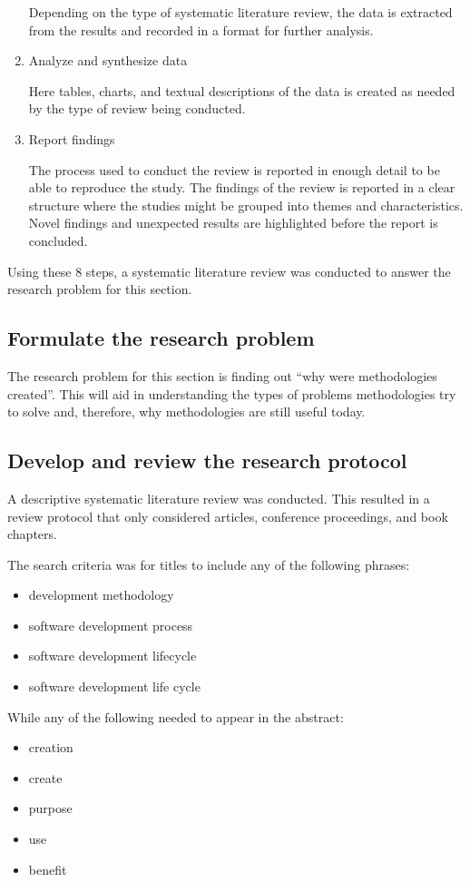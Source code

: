 \begin{enumerate}
      Depending on the type of systematic literature review, the data is extracted from the results and recorded in a format for further analysis.
    \item Analyze and synthesize data

      Here tables, charts, and textual descriptions of the data is created as needed by the type of review being conducted.
    \item Report findings

      The process used to conduct the review is reported in enough detail to be able to reproduce the study.
      The findings of the review is reported in a clear structure where the studies might be grouped into themes and characteristics.
      Novel findings and unexpected results are highlighted before the report is concluded.
\end{enumerate}

Using these 8 steps, a systematic literature review was conducted to answer the research problem for this section.

\subsection{Formulate the research problem}
The research problem for this section is finding out ``why were methodologies created''.
This will aid in understanding the types of problems methodologies try to solve and, therefore, why methodologies are still useful today.

\subsection{Develop and review the research protocol}
A descriptive systematic literature review was conducted.
This resulted in a review protocol that only considered articles, conference proceedings, and book chapters.

The search criteria was for titles to include any of the following phrases:
\begin{itemize}
    \item development methodology
    \item software development process
    \item software development lifecycle
    \item software development life cycle
\end{itemize}

While any of the following needed to appear in the abstract:
\begin{itemize}
    \item creation
    \item create
    \item purpose
    \item use
    \item benefit
\end{itemize}

